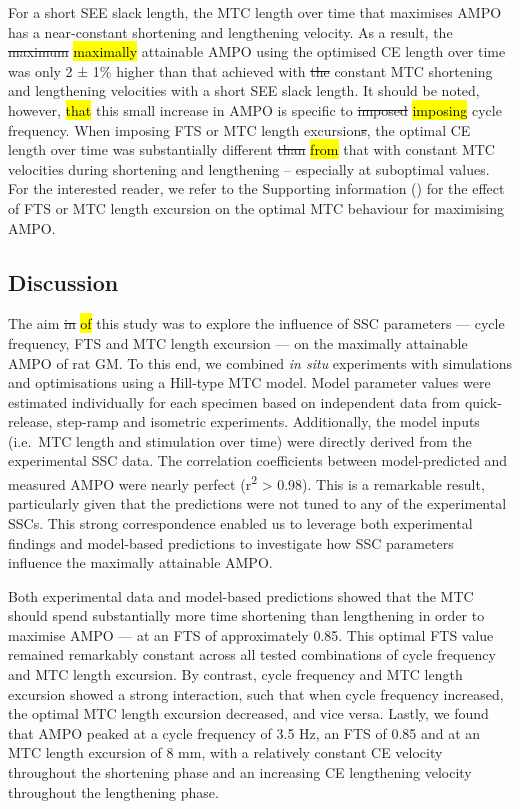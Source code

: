\documentclass[
  10pt,
  letterpaper,
]{article}
\begin{document}
For a short SEE slack length, the MTC length over time that maximises
AMPO has a near-constant shortening and lengthening velocity. As a
result, the \st{maximum} \hl{maximally} attainable AMPO using the
optimised CE length over time was only 2 ± 1\% higher than that achieved
with \st{the} constant MTC shortening and lengthening velocities with a
short SEE slack length. It should be noted, however, \hl{that} this
small increase in AMPO is specific to \st{imposed} \hl{imposing} cycle
frequency. When imposing FTS or MTC length excursion\st{s}, the optimal
CE length over time was substantially different \st{than} \hl{from} that
with constant MTC velocities during shortening and lengthening --
especially at suboptimal values. For the interested reader, we refer to
the Supporting information ({}) for the effect of FTS
or MTC length excursion on the optimal MTC behaviour for maximising
AMPO.

\subsection{Discussion}\label{discussion}

The aim \st{in} \hl{of} this study was to explore the influence of SSC
parameters --- cycle frequency, FTS and MTC length excursion --- on the
maximally attainable AMPO of rat GM. To this end, we combined \emph{in
situ} experiments with simulations and optimisations using a Hill-type
MTC model. Model parameter values were estimated individually for each
specimen based on independent data from quick-release, step-ramp and
isometric experiments. Additionally, the model inputs (i.e.~MTC length
and stimulation over time) were directly derived from the experimental
SSC data. The correlation coefficients between model-predicted and
measured AMPO were nearly perfect (r\textsuperscript{2} \textgreater{}
0.98). This is a remarkable result, particularly given that the
predictions were not tuned to any of the experimental SSCs. This strong
correspondence enabled us to leverage both experimental findings and
model-based predictions to investigate how SSC parameters influence the
maximally attainable AMPO.

Both experimental data and model-based predictions showed that the MTC
should spend substantially more time shortening than lengthening in
order to maximise AMPO --- at an FTS of approximately 0.85. This optimal
FTS value remained remarkably constant across all tested combinations of
cycle frequency and MTC length excursion. By contrast, cycle frequency
and MTC length excursion showed a strong interaction, such that when
cycle frequency increased, the optimal MTC length excursion decreased,
and vice versa. Lastly, we found that AMPO peaked at a cycle frequency
of 3.5 Hz, an FTS of 0.85 and at an MTC length excursion of 8 mm, with a
relatively constant CE velocity throughout the shortening phase and an
increasing CE lengthening velocity throughout the lengthening phase.
\end{document}
